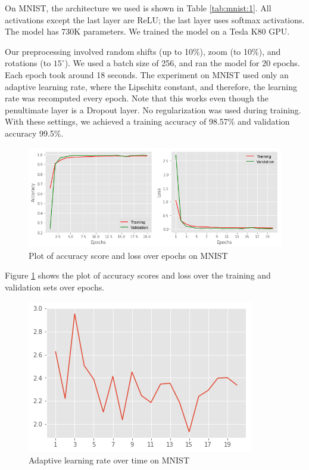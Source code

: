 \documentclass{article}
\begin{document}
On MNIST, the architecture we used is shown in Table \ref{tab:mnist:1}. All activations except the last layer are ReLU; the last layer uses softmax activations. The model has 730K parameters. We trained the model on a Tesla K80 GPU.

Our preprocessing involved random shifts (up to 10\%), zoom (to 10\%), and rotations (to $15^\circ$). We used a batch size of 256, and ran the model for 20 epochs. Each epoch took around 18 seconds. The experiment on MNIST used only an adaptive learning rate, where the Lipschitz constant, and therefore, the learning rate was recomputed every epoch. Note that this works even though the penultimate layer is a Dropout layer. No regularization was used during training. With these settings, we achieved a training accuracy of 98.57\% and validation accuracy 99.5\%. 

\begin{figure}
    \centering
    \includegraphics[scale=0.4]{mnist-plot.png}
    \caption{Plot of accuracy score and loss over epochs on MNIST}
    \label{fig:mnist:1}
\end{figure}

Figure \ref{fig:mnist:1} shows the plot of accuracy scores and loss over the training and validation sets over epochs.

\begin{figure}
    \centering
    \includegraphics[scale=0.4]{mnist-lr.png}
    \caption{Adaptive learning rate over time on MNIST}
    \label{fig:mnist:2}
\end{figure}
\end{document}
